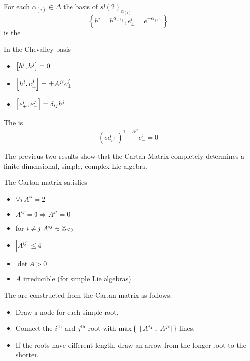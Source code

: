 \documentclass{article}
\begin{document}
\begin{definition}
	For each $\alpha_{(i)}\in\Delta$ the basis of $sl(2)_{\alpha_{(i)}}$
	\[
	\left\{ h^i=h^{\alpha_{(i)}}, e^i_\pm=e^{\pm\alpha_{(i)}} \right\}
	\]
	is the 
\end{definition}

\begin{theorem}
	In the Chevalley basis
	\begin{itemize}
		\item $\comm[h^i]{h^j}=0$
		\item $\comm[h^i]{e^j_\pm}=\pm A^{ji} e^j_\pm$
		\item $\comm[e^i_+]{e^j_-}=\delta_{ij} h^i$
	\end{itemize}
\end{theorem}

\begin{theorem}
	The  is 
	\[
	\left( ad_{e^i_\pm}\right)^{1-A^{ji}} e^j_\pm=0
	\]
\end{theorem}

\begin{idea}
	The previous two results show that the Cartan Matrix completely determines a finite dimensional, simple, complex Lie algebra. 
\end{idea}

\begin{theorem}
	The Cartan matrix satisfies
	\begin{itemize}
		\item $\forall i \, A^{ii}=2$
		\item $A^{ij}=0 \Rightarrow A^{ji}=0$
		\item for $i \neq j \; A^{ij}\in\mbb{Z}_{\leq0}$
		\item $|A^{ij}|\leq4$
		\item $\det{A}>0$
		\item $A$ irreducible (for simple Lie algebras)
	\end{itemize}
\end{theorem}

\begin{definition}
	The  are constructed from the Cartan matrix as follows:
	\begin{itemize}
		\item Draw a node for each simple root.
		\item Connect the $i^{\text{th}}$ and $j^\text{th}$ root with $\max\set{  |A^{ij}|, |A^{ji}|  }$ lines. 
		\item If the roots have different length, draw an arrow from the longer root to the shorter. 
	\end{itemize}
\end{definition}
\end{document}
